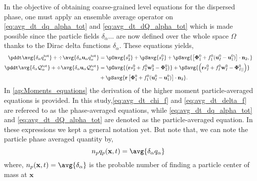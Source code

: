 
In the objective of obtaining coarse-grained level equations for the dispersed phase, one must apply an ensemble average operator on \ref{eq:avg_dt_dq_alpha_tot} and \ref{eq:avg_dt_dQ_alpha_tot} which is made possible since the particle fields $\delta_\alpha \ldots$ are now defined over the whole space $\Omega$ thanks to the Dirac delta functions $\delta_\alpha$.  
These equations yields,
\begin{align}
    \pddt \avg{\delta_\alpha  q_\alpha^\text{tot}}
    + \div \avg{\delta_\alpha\textbf{u}_\alpha q_\alpha^\text{tot}}
    &= \pOavg{ s_2^0 }
    + \pSavg{ s_I^0 }
    + \pSavg{ \left[\mathbf{\Phi}_1^0 + f_1^0 (\textbf{u}_I^0-\textbf{u}_1^0) \right] \cdot \textbf{n}_2 ,}
    \label{eq:avg_dt_dq_alpha_tot}\\
    \pddt \avg{\delta_\alpha \mathcal{Q}_\alpha^\text{tot}}
    + \div \avg{\delta_\alpha\textbf{u}_\alpha\mathcal{Q}_\alpha^\text{tot}}
    &=\pOavg{ \left(
        \textbf{r} s_2^0         
        + f_2^0  \textbf{w}_2^0 
        - \mathbf{\Phi}_2^0
    \right) }
    + \pSavg{ \left(
        \textbf{r}s_I^0
        + f_I^0 \textbf{w}_I^0
        - \mathbf{\Phi}_{I||}^0
    \right) }\nonumber\\
    &+ \pSavg{ \textbf{r} \left[
        \mathbf{\Phi}_1^0
        + f_1^0 (\textbf{u}_I^0-\textbf{u}_1^0)
    \right]\cdot \textbf{n}_2  }.
    \label{eq:avg_dt_dQ_alpha_tot}
\end{align}
In \ref{ap:Moments_equations} the derivation of the higher moment particle-averaged equations is provided. 
In this study,\ref{eq:avg_dt_chi_f} and \ref{eq:avg_dt_delta_f} are refereed to as the phase-averaged equations, while \ref{eq:avg_dt_dq_alpha_tot} and \ref{eq:avg_dt_dQ_alpha_tot} are denoted as the particle-averaged equation. 
In these expressions we kept a general notation yet. 
But note that, we can note the particle phase averaged quantity by,
\begin{equation}
     n_p q_p(\textbf{x},t) = \avg{\delta_\alpha q_\alpha}
     \label{eq:p_avg}
\end{equation}
where, $n_p(\textbf{x},t) = \avg{\delta_\alpha}$ is the probable number of finding a particle center of mass at $\textbf{x}$
